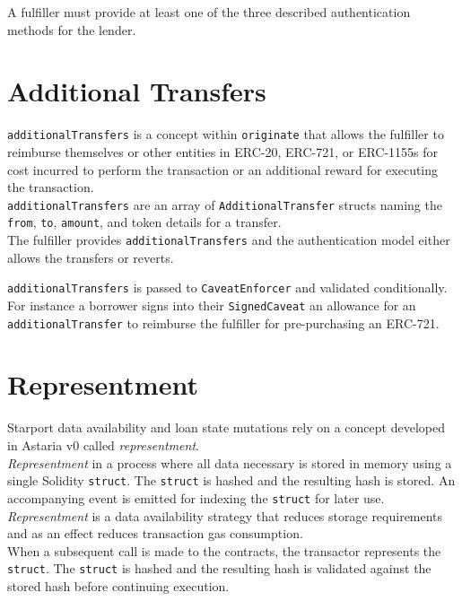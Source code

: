 \documentclass[12pt]{article}
\begin{document}
A fulfiller must provide at least one of the three described authentication methods for the lender.

\section{Additional Transfers}
\texttt{additionalTransfers} is a concept within \texttt{originate} that allows the fulfiller to reimburse themselves or other entities in ERC-20, ERC-721, or ERC-1155s for cost incurred to perform the transaction or an additional reward for executing the transaction.\\

\texttt{additionalTransfers} are an array of \texttt{AdditionalTransfer} structs naming the \texttt{from}, \texttt{to}, \texttt{amount}, and token details for a transfer.\\

The fulfiller provides \texttt{additionalTransfers} and the authentication model either allows the transfers or reverts.

\texttt{additionalTransfers} is passed to \texttt{CaveatEnforcer} and validated conditionally. For instance a borrower signs into their \texttt{SignedCaveat} an allowance for an \texttt{additionalTransfer} to reimburse the fulfiller for pre-purchasing an ERC-721.

\section{Representment}
Starport data availability and loan state mutations rely on a concept developed in Astaria v0 called \emph{representment}.\\

\emph{Representment} in a process where all data necessary is stored in memory using a single Solidity \texttt{struct}. The \texttt{struct} is hashed and the resulting hash is stored. An accompanying event is emitted for indexing the \texttt{struct} for later use.\\

\emph{Representment} is a data availability strategy that reduces storage requirements and as an effect reduces transaction gas consumption.\\

When a subsequent call is made to the contracts, the transactor represents the \texttt{struct}. The \texttt{struct} is hashed and the resulting hash is validated against the stored hash before continuing execution.\\
\end{document}
